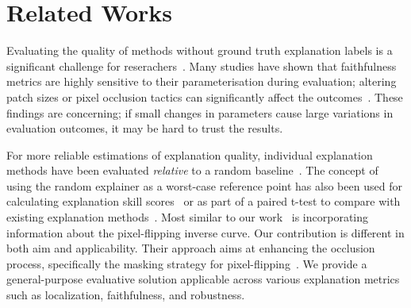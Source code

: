 \section{Related Works}

Evaluating the quality of methods without ground truth explanation labels is a significant challenge for reserachers~\cite{brunke, brocki2022, rong2022, hedstrom2023metaquantus}. Many studies have shown that faithfulness metrics are highly sensitive to their parameterisation during evaluation; altering patch sizes or pixel occlusion tactics can significantly affect the outcomes~\cite{tomsett2020, brunke, brocki2022, rong2022, hedstrom2023metaquantus}. %
These findings are concerning; if small changes in parameters cause large variations in evaluation outcomes, it may be hard to trust the results. 
 
For more reliable estimations of explanation quality, individual explanation methods have been evaluated \textit{relative} to a random baseline~\cite{samek2015, nguyen2020, ancona2019}. The concept of using the random explainer as a worst-case reference point has also been used for calculating explanation skill scores~\citep{findingrightbommer} or as part of a paired t-test to compare with existing explanation methods~\citep{irof2020}. Most similar to our work~\cite{blücher2024decoupling} is incorporating information about the pixel-flipping inverse curve. Our contribution is different in both aim and applicability. Their approach aims at enhancing the occlusion process, specifically the masking strategy for pixel-flipping~\cite{samek2015}. We provide a general-purpose evaluative solution applicable across various explanation metrics such as localization, faithfulness, and robustness.


